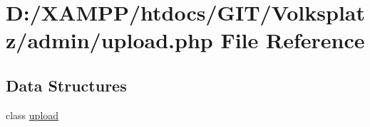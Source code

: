 \hypertarget{upload_8php}{}\section{D\+:/\+X\+A\+M\+P\+P/htdocs/\+G\+I\+T/\+Volksplatz/admin/upload.php File Reference}
\label{upload_8php}
\subsection*{Data Structures}
\begin{DoxyCompactItemize}
\item 
class \mbox{\hyperlink{classupload}{upload}}
\end{DoxyCompactItemize}
